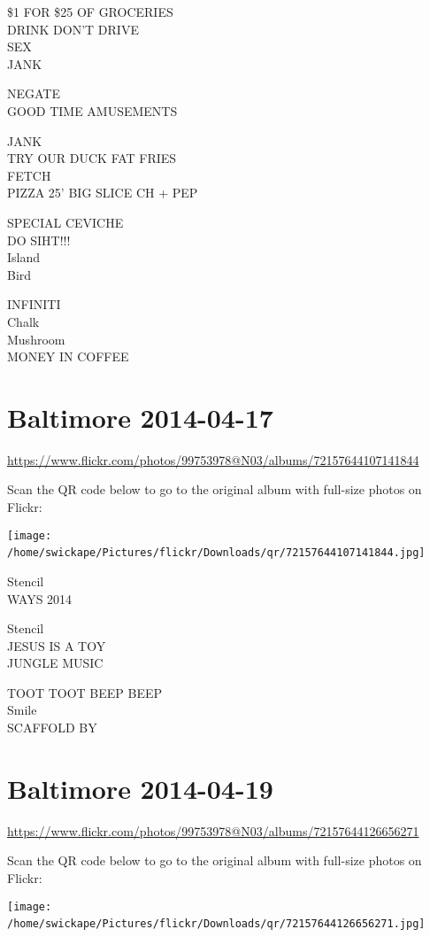 \documentclass[10pt,letterpaper]{article}
\begin{document}
\$1 FOR \$25 OF GROCERIES\\
DRINK DON'T DRIVE\\
SEX\\
JANK

NEGATE\\
GOOD TIME AMUSEMENTS

JANK\\
TRY OUR DUCK FAT FRIES\\
FETCH\\
PIZZA 25' BIG SLICE CH + PEP

SPECIAL CEVICHE\\
DO SIHT!!!\\
Island\\
Bird

INFINITI\\
Chalk\\
Mushroom\\
MONEY IN COFFEE
\

\section*{Baltimore 2014-04-17}

\url{https://www.flickr.com/photos/99753978@N03/albums/72157644107141844}

Scan the QR code below to go to the original album with full-size photos on Flickr:

\texttt{[image: /home/swickape/Pictures/flickr/Downloads/qr/72157644107141844.jpg]}
\

Stencil\\
WAYS 2014

Stencil\\
JESUS IS A TOY\\
JUNGLE MUSIC

TOOT TOOT BEEP BEEP\\
Smile\\
SCAFFOLD BY
\

\section*{Baltimore 2014-04-19}

\url{https://www.flickr.com/photos/99753978@N03/albums/72157644126656271}

Scan the QR code below to go to the original album with full-size photos on Flickr:

\texttt{[image: /home/swickape/Pictures/flickr/Downloads/qr/72157644126656271.jpg]}
\
\end{document}
